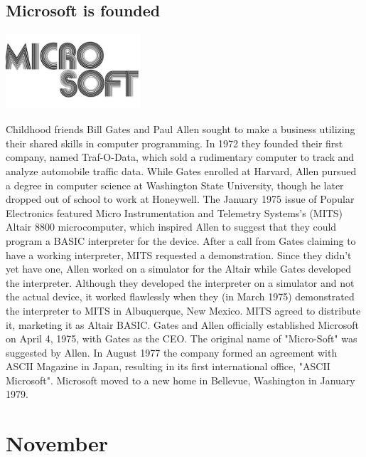 \documentclass[11pt]{report}
\begin{document}
\subsection{Microsoft is founded}
\vspace{2mm}\begin{center}\includegraphics[width=5cm]{./img/microsoft1stlogo.jpg}\end{center}
Childhood friends Bill Gates and Paul Allen sought to make a business utilizing their shared skills in computer programming. In 1972 they founded their first company, named Traf-O-Data, which sold a rudimentary computer to track and analyze automobile traffic data. While Gates enrolled at Harvard, Allen pursued a degree in computer science at Washington State University, though he later dropped out of school to work at Honeywell. The January 1975 issue of Popular Electronics featured Micro Instrumentation and Telemetry Systems's (MITS) Altair 8800 microcomputer, which inspired Allen to suggest that they could program a BASIC interpreter for the device. After a call from Gates claiming to have a working interpreter, MITS requested a demonstration. Since they didn't yet have one, Allen worked on a simulator for the Altair while Gates developed the interpreter. Although they developed the interpreter on a simulator and not the actual device, it worked flawlessly when they (in March 1975) demonstrated the interpreter to MITS in Albuquerque, New Mexico. MITS agreed to distribute it, marketing it as Altair BASIC. Gates and Allen officially established Microsoft on April 4, 1975, with Gates as the CEO. The original name of "Micro-Soft" was suggested by Allen. In August 1977 the company formed an agreement with ASCII Magazine in Japan, resulting in its first international office, "ASCII Microsoft". Microsoft moved to a new home in Bellevue, Washington in January 1979.

\section{November}
\end{document}
